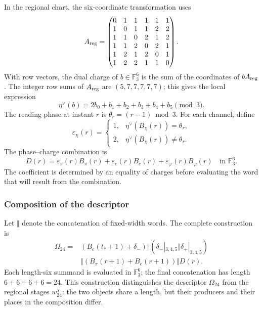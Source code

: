 In the regional chart, the six-coordinate transformation uses
\[
 A_{\rm reg}=
 \begin{pmatrix}
 0&1&1&1&1&1\\
 1&0&1&1&2&2\\
 1&1&0&2&1&2\\
 1&1&2&0&2&1\\
 1&2&1&2&0&1\\
 1&2&2&1&1&0
 \end{pmatrix}.
\]
With row vectors, the dual charge of $b\in\mathbb F_3^6$ is the sum
of the coordinates of $bA_{\rm reg}$. The integer row sums of
$A_{\rm reg}$ are $(5,7,7,7,7,7)$; this gives the local expression
\begin{equation}
 \eta^\vee(b)=2b_0+b_1+b_2+b_3+b_4+b_5\pmod3.
 \label{act21:eq:kdes-cargadual}
\end{equation}
The reading phase at instant $r$ is
$\theta_r=(r-1)\bmod3$. For each channel, define
\[
 \varepsilon_\chi(r)=
 \begin{cases}
 1,&\eta^\vee(B_\chi(r))=\theta_r,\\
 2,&\eta^\vee(B_\chi(r))\ne\theta_r.
 \end{cases}
\]
The phase--charge combination is
\begin{equation}
 D(r)=\varepsilon_\pi(r)B_\pi(r)
      +\varepsilon_e(r)B_e(r)
      +\varepsilon_\varphi(r)B_\varphi(r)
      \quad\text{in }\mathbb F_3^6.
 \label{act21:eq:kdes-fasecarga}
\end{equation}
The coefficient is determined by an equality of charges before evaluating
the word that will result from the combination.

\subsubsection{Composition of the descriptor}

Let $\Vert$ denote the concatenation of fixed-width words.
The complete construction is
\begin{equation}
 \begin{split}
 \Omega_{24}={}&
 (B_e(t_*+1)+\delta_-)
 \Vert (\delta_-|_{3,4,5}\Vert\delta_+|_{3,4,5})\\
 &\Vert(B_\pi(r+1)+B_e(r+1))\Vert D(r).
 \end{split}
 \label{act21:eq:kdes-omega}
\end{equation}
Each length-six summand is evaluated in $\mathbb F_3^6$; the
final concatenation has length $6+6+6+6=24$. This construction
distinguishes the descriptor $\Omega_{24}$ from the regional stages
$w_{24}^{\chi}$: the two objects share a length, but their producers
and their places in the composition differ.

